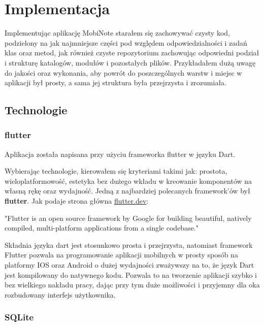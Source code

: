 \chapter{Implementacja}

Implementując aplikację MobiNote starałem się zachowywać czysty kod, podzielony na jak najmniejsze części pod względem odpowiedzialności i zadań klas oraz metod, jak również czyste repozytorium zachowując odpowiedni podział i strukturę katalogów, modułów i pozostałych plików. Przykładałem dużą uwagę do jakości oraz wykonania, aby powrót do poszczególnych warstw i miejsc w aplikacji był prosty, a sama jej struktura była przejrzysta i zrozumiała. 


\section{Technologie}

\subsection{flutter}

Aplikacja została napisana przy użyciu frameworka flutter w języku Dart.

Wybierając technologie, kierowałem się kryteriami takimi jak: prostota, wieloplatformowość, estetyka bez dużego wkładu w kreowanie komponentów na własną rękę oraz wydajność. Jedną z najbardziej polecanych framework'ów był \textbf{flutter}. Jak podaje strona główna \url{flutter.dev}:

"Flutter is an open source framework by Google for building beautiful, natively compiled, multi-platform applications from a single codebase."

Składnia języka dart jest stosunkowo prosta i przejrzysta, natomiast framework Flutter pozwala na programowanie aplikacji mobilnych w prosty sposób na platformy IOS oraz Android o dużej wydajności zważywszy na to, że język Dart jest kompilowany do natywnego kodu. Pozwala to na tworzenie aplikacji szybko i bez wielkiego nakładu pracy, dając przy tym duże możliwości i przyjemny dla oka rozbudowany interfejs użytkownika.


\subsection{SQLite}

